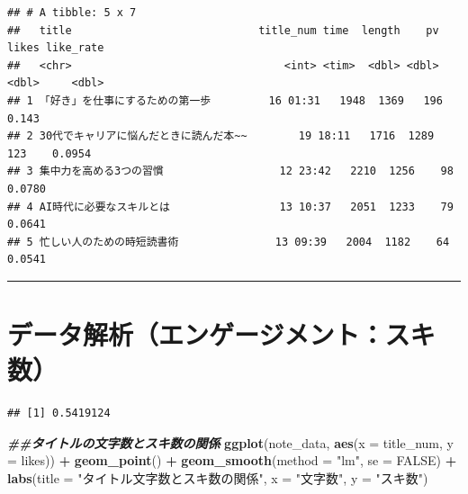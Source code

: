 \documentclass[
]{article}
\newenvironment{Shaded}{\begin{snugshade}}{\end{snugshade}}
\newcommand{\AttributeTok}[1]{\textcolor[rgb]{0.13,0.29,0.53}{#1}}
\newcommand{\ConstantTok}[1]{\textcolor[rgb]{0.56,0.35,0.01}{#1}}
\newcommand{\DocumentationTok}[1]{\textcolor[rgb]{0.56,0.35,0.01}{\textbf{\textit{#1}}}}
\newcommand{\FunctionTok}[1]{\textcolor[rgb]{0.13,0.29,0.53}{\textbf{#1}}}
\newcommand{\NormalTok}[1]{#1}
\newcommand{\SpecialCharTok}[1]{\textcolor[rgb]{0.81,0.36,0.00}{\textbf{#1}}}
\newcommand{\StringTok}[1]{\textcolor[rgb]{0.31,0.60,0.02}{#1}}
\begin{document}
\begin{verbatim}
## # A tibble: 5 x 7
##   title                             title_num time  length    pv likes like_rate
##   <chr>                                 <int> <tim>  <dbl> <dbl> <dbl>     <dbl>
## 1 「好き」を仕事にするための第一歩         16 01:31   1948  1369   196    0.143 
## 2 30代でキャリアに悩んだときに読んだ本~~        19 18:11   1716  1289   123    0.0954
## 3 集中力を高める3つの習慣                  12 23:42   2210  1256    98    0.0780
## 4 AI時代に必要なスキルとは                 13 10:37   2051  1233    79    0.0641
## 5 忙しい人のための時短読書術               13 09:39   2004  1182    64    0.0541
\end{verbatim}

\begin{center}\rule{0.5\linewidth}{0.5pt}\end{center}

\section{データ解析（エンゲージメント：スキ数）}\label{ux30c7ux30fcux30bfux89e3ux6790ux30a8ux30f3ux30b2ux30fcux30b8ux30e1ux30f3ux30c8ux30b9ux30adux6570}

\begin{Shaded}
\end{Shaded}

\begin{verbatim}
## [1] 0.5419124
\end{verbatim}

\begin{Shaded}
\begin{Highlighting}[]
\DocumentationTok{\#\#タイトルの文字数とスキ数の関係}
\FunctionTok{ggplot}\NormalTok{(note\_data, }\FunctionTok{aes}\NormalTok{(}\AttributeTok{x =}\NormalTok{ title\_num, }\AttributeTok{y =}\NormalTok{ likes)) }\SpecialCharTok{+}
  \FunctionTok{geom\_point}\NormalTok{() }\SpecialCharTok{+}
  \FunctionTok{geom\_smooth}\NormalTok{(}\AttributeTok{method =} \StringTok{"lm"}\NormalTok{, }\AttributeTok{se =} \ConstantTok{FALSE}\NormalTok{) }\SpecialCharTok{+}
  \FunctionTok{labs}\NormalTok{(}\AttributeTok{title =} \StringTok{"タイトル文字数とスキ数の関係"}\NormalTok{, }\AttributeTok{x =} \StringTok{"文字数"}\NormalTok{, }\AttributeTok{y =} \StringTok{"スキ数"}\NormalTok{)}
\end{Highlighting}
\end{Shaded}
\end{document}
